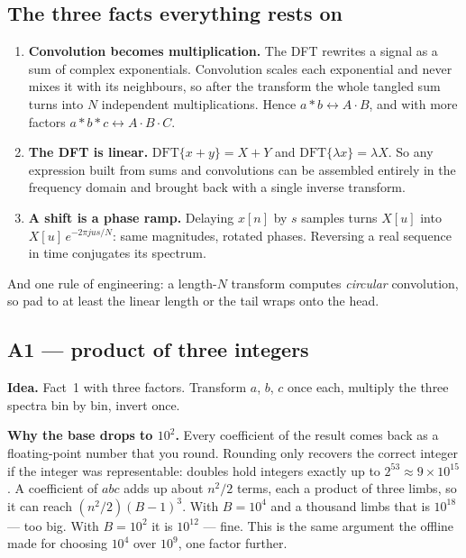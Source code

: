 \documentclass[11pt]{article}
\begin{document}
\subsection*{The three facts everything rests on}

\begin{enumerate}[nosep]
  \item \textbf{Convolution becomes multiplication.} The DFT rewrites a signal
        as a sum of complex exponentials. Convolution scales each exponential
        and never mixes it with its neighbours, so after the transform the
        whole tangled sum turns into $N$ independent multiplications. Hence
        $a * b \leftrightarrow A \cdot B$, and with more factors
        $a * b * c \leftrightarrow A \cdot B \cdot C$.
  \item \textbf{The DFT is linear.} $\mathrm{DFT}\{x + y\} = X + Y$ and
        $\mathrm{DFT}\{\lambda x\} = \lambda X$. So any expression built from
        sums and convolutions can be assembled entirely in the frequency domain
        and brought back with a single inverse transform.
  \item \textbf{A shift is a phase ramp.} Delaying $x[n]$ by $s$ samples turns
        $X[u]$ into $X[u]\,e^{-2\pi j u s / N}$: same magnitudes, rotated
        phases. Reversing a real sequence in time conjugates its spectrum.
\end{enumerate}
And one rule of engineering: a length-$N$ transform computes \emph{circular}
convolution, so pad to at least the linear length or the tail wraps onto the
head.

\subsection*{A1 --- product of three integers}

\textbf{Idea.} Fact~1 with three factors. Transform $a$, $b$, $c$ once each,
multiply the three spectra bin by bin, invert once.

\textbf{Why the base drops to $10^2$.} Every coefficient of the result comes
back as a floating-point number that you round. Rounding only recovers the
correct integer if the integer was representable: doubles hold integers
exactly up to $2^{53} \approx 9 \times 10^{15}$. A coefficient of $a b c$ adds
up about $n^2/2$ terms, each a product of three limbs, so it can reach
$(n^2/2)(B-1)^3$. With $B = 10^4$ and a thousand limbs that is $10^{18}$ ---
too big. With $B = 10^2$ it is $10^{12}$ --- fine. This is the same argument
the offline made for choosing $10^4$ over $10^9$, one factor further.
\end{document}
